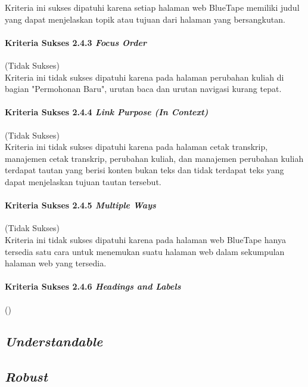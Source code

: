 Kriteria ini sukses dipatuhi karena setiap halaman web BlueTape memiliki judul yang dapat menjelaskan topik atau tujuan dari halaman yang bersangkutan.

\paragraph{Kriteria Sukses 2.4.3 \textit{Focus Order}}
\label{par:kepatuhan_bluetape_kriteria_sukses_2.4.3}
(Tidak Sukses)\\

Kriteria ini tidak sukses dipatuhi karena pada halaman perubahan kuliah di bagian "Permohonan Baru", urutan baca dan urutan navigasi kurang tepat.

\paragraph{Kriteria Sukses 2.4.4 \textit{Link Purpose (In Context)}}
\label{par:kepatuhan_bluetape_kriteria_sukses_2.4.4}
(Tidak Sukses)\\

Kriteria ini tidak sukses dipatuhi karena pada halaman cetak transkrip, manajemen cetak transkrip, perubahan kuliah, dan manajemen perubahan kuliah terdapat tautan yang berisi konten bukan teks dan tidak terdapat teks yang dapat menjelaskan tujuan tautan tersebut.

\paragraph{Kriteria Sukses 2.4.5 \textit{Multiple Ways}}
\label{par:kepatuhan_bluetape_kriteria_sukses_2.4.5}
(Tidak Sukses)\\

Kriteria ini tidak sukses dipatuhi karena pada halaman web BlueTape hanya tersedia satu cara untuk menemukan suatu halaman web dalam sekumpulan halaman web yang tersedia.

\paragraph{Kriteria Sukses 2.4.6 \textit{Headings and Labels}}
\label{par:kepatuhan_bluetape_kriteria_sukses_2.4.6}
()\\



\subsection{\textit{Understandable}}
\label{subsec:kepatuhan_bluetape_understandable}

\subsection{\textit{Robust}}
\label{subsec:kepatuhan_bluetape_robust}